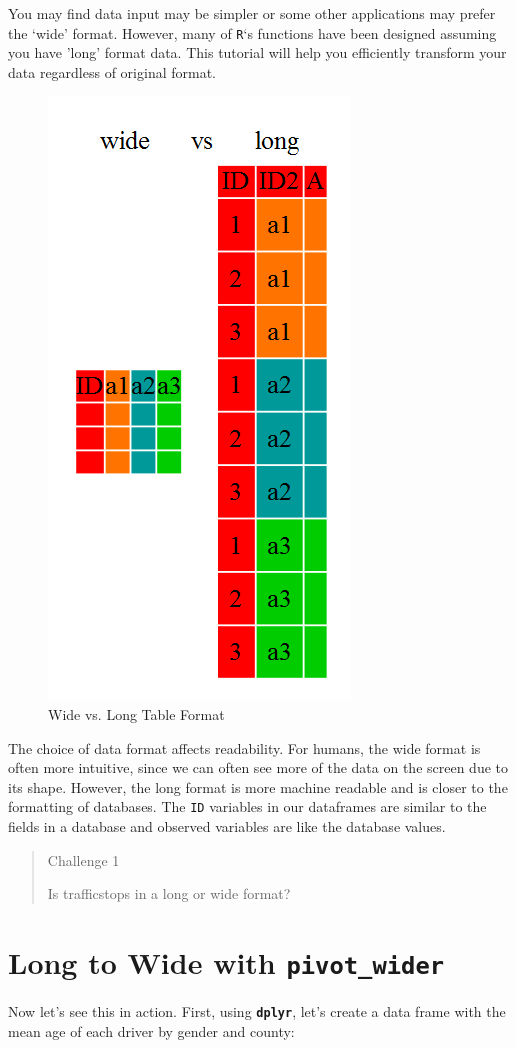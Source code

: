 \documentclass[]{book}
\begin{document}
You may find data input may be simpler or some other
applications may prefer the `wide' format. However, many of \texttt{R}`s functions have
been designed assuming you have 'long' format data. This tutorial will help you
efficiently transform your data regardless of original format.

\begin{figure}
\includegraphics[width=0.3\linewidth]{img/wide-vs-long} \caption{Wide vs. Long Table Format}\label{fig:wide-vs-long}
\end{figure}

The choice of data format affects readability. For humans, the wide format is often more intuitive, since we can often see more of the data on the screen due to its shape. However, the long format is more machine readable and is closer to the formatting of databases. The \texttt{ID} variables in our dataframes are similar to the fields in a database and observed variables are like the database values.

\begin{quote}
Challenge 1

Is trafficstops in a long or wide format?
\end{quote}

\hypertarget{long-to-wide-with-pivot_wider}{%
\section{\texorpdfstring{Long to Wide with \texttt{pivot\_wider}}{Long to Wide with pivot\_wider}}\label{long-to-wide-with-pivot_wider}}

Now let's see this in action. First, using \textbf{\texttt{dplyr}}, let's create a data frame
with the mean age of each driver by gender and county:
\end{document}
